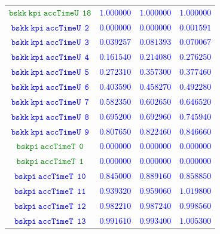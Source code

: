\documentclass[10pt,a4paper]{article}
\begin{document}
\begin{table}[h!]
{\begin{tabular}{cccc}
\textcolor{Green}{$\mathtt{bskk~kpi~accTimeU~~18}$} & \textcolor{blue}{$1.000000$}& \textcolor{blue}{$1.000000$}& \textcolor{blue}{$1.000000$}\\
\textcolor{blue}{$\mathtt{bskk~kpi~accTimeU~~2}$} & \textcolor{blue}{$0.000000$}& \textcolor{blue}{$0.000000$}& \textcolor{blue}{$0.001591$}\\
\textcolor{blue}{$\mathtt{bskk~kpi~accTimeU~~3}$} & \textcolor{blue}{$0.039257$}& \textcolor{blue}{$0.081393$}& \textcolor{blue}{$0.070067$}\\
\textcolor{blue}{$\mathtt{bskk~kpi~accTimeU~~4}$} & \textcolor{blue}{$0.161540$}& \textcolor{blue}{$0.214080$}& \textcolor{blue}{$0.276250$}\\
\textcolor{blue}{$\mathtt{bskk~kpi~accTimeU~~5}$} & \textcolor{blue}{$0.272310$}& \textcolor{blue}{$0.357300$}& \textcolor{blue}{$0.377460$}\\
\textcolor{blue}{$\mathtt{bskk~kpi~accTimeU~~6}$} & \textcolor{blue}{$0.403590$}& \textcolor{blue}{$0.458270$}& \textcolor{blue}{$0.492280$}\\
\textcolor{blue}{$\mathtt{bskk~kpi~accTimeU~~7}$} & \textcolor{blue}{$0.582350$}& \textcolor{blue}{$0.602650$}& \textcolor{blue}{$0.646520$}\\
\textcolor{blue}{$\mathtt{bskk~kpi~accTimeU~~8}$} & \textcolor{blue}{$0.695200$}& \textcolor{blue}{$0.692960$}& \textcolor{blue}{$0.745940$}\\
\textcolor{blue}{$\mathtt{bskk~kpi~accTimeU~~9}$} & \textcolor{blue}{$0.807650$}& \textcolor{blue}{$0.822460$}& \textcolor{blue}{$0.846660$}\\
\textcolor{Green}{$\mathtt{bskpi~accTimeT~~0}$} & \textcolor{blue}{$0.000000$}& \textcolor{blue}{$0.000000$}& \textcolor{blue}{$0.000000$}\\
\textcolor{Green}{$\mathtt{bskpi~accTimeT~~1}$} & \textcolor{blue}{$0.000000$}& \textcolor{blue}{$0.000000$}& \textcolor{blue}{$0.000000$}\\
\textcolor{blue}{$\mathtt{bskpi~accTimeT~~10}$} & \textcolor{blue}{$0.845000$}& \textcolor{blue}{$0.889160$}& \textcolor{blue}{$0.858850$}\\
\textcolor{blue}{$\mathtt{bskpi~accTimeT~~11}$} & \textcolor{blue}{$0.939320$}& \textcolor{blue}{$0.959060$}& \textcolor{blue}{$1.019800$}\\
\textcolor{blue}{$\mathtt{bskpi~accTimeT~~12}$} & \textcolor{blue}{$0.982210$}& \textcolor{blue}{$0.987240$}& \textcolor{blue}{$0.998560$}\\
\textcolor{blue}{$\mathtt{bskpi~accTimeT~~13}$} & \textcolor{blue}{$0.991610$}& \textcolor{blue}{$0.993400$}& \textcolor{blue}{$1.005300$}\\

\end{tabular}}
\end{table}
\end{document}
